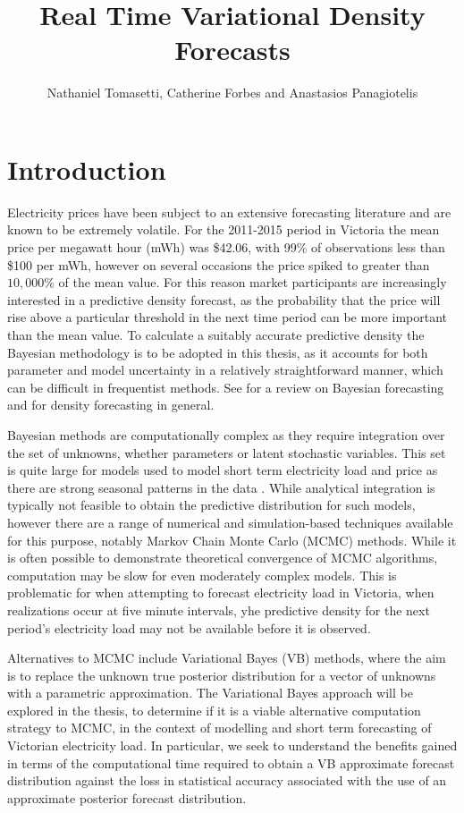 \documentclass[12pt,a4paper]{article}%
\title{Real Time Variational Density Forecasts}
\author{Nathaniel Tomasetti, Catherine Forbes and Anastasios Panagiotelis}
\numberwithin{equation}{section}
\begin{document}
\maketitle
\tableofcontents
\section{Introduction} \label{sec:Intro}

Electricity prices have been subject to an extensive forecasting literature and are known to be extremely volatile. For the 2011-2015 period in Victoria the mean price per megawatt hour (mWh) was \$42.06, with 99\% of observations less than \$100 per mWh, however on several occasions the price spiked to greater than $10,000\%$ of the mean value. For this reason market participants are increasingly interested in a predictive density forecast, as the probability that the price will rise above a particular threshold in the next time period can be more important than the mean value. To calculate a suitably accurate predictive density the Bayesian methodology is to be adopted in this thesis, as it accounts for both parameter and model uncertainty in a relatively straightforward manner, which can be difficult in frequentist methods. See \citet{Geweke2006} for a review on Bayesian forecasting and \citet{Gneiting2014} for density forecasting in general. 

Bayesian methods are computationally complex as they require integration over the set of unknowns, whether parameters or latent stochastic variables. This set is quite large for models used to model short term electricity load and price as there are strong seasonal patterns in the data \citep{Taylor2003}. While analytical integration is typically not feasible to obtain the predictive distribution for such models, however there are a range of numerical and simulation-based techniques available for this purpose, notably Markov Chain Monte Carlo (MCMC) methods. While it is often possible to demonstrate theoretical convergence of MCMC algorithms, computation may be slow for even moderately complex models. This is problematic for when attempting to forecast electricity load in Victoria, when realizations occur at five minute intervals, yhe predictive density for the next period's electricity load may not be available before it is observed.

Alternatives to MCMC include Variational Bayes (VB) methods, where the aim is to replace the unknown true posterior distribution for a vector of unknowns with a parametric approximation. The Variational Bayes approach will be explored in the thesis, to determine if it is a viable alternative computation strategy to MCMC, in the context of modelling and short term forecasting of Victorian electricity load. In particular, we seek to understand the benefits gained in terms of the computational time required to obtain a VB approximate forecast distribution against the loss in statistical accuracy associated with the use of an approximate posterior forecast distribution. 
\end{document}
